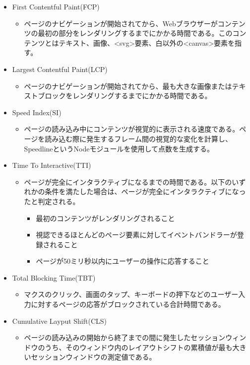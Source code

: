 \begin{itemize}
    \item First Contentful Paint(FCP)
    \begin{itemize}
        \item ページのナビゲーションが開始されてから、Webブラウザーがコンテンツの最初の部分をレンダリングするまでにかかる時間である。このコンテンツとはテキスト、画像、<svg>要素、白以外の<canvas>要素を指す。
    \end{itemize}
    \item Largest Contentful Paint(LCP)
    \begin{itemize}
        \item ページのナビゲーションが開始されてから、最も大きな画像またはテキストブロックをレンダリングするまでにかかる時間である。
    \end{itemize}
    \item Speed Index(SI)
    \begin{itemize}
        \item ページの読み込み中にコンテンツが視覚的に表示される速度である。ページを読み込む際に発生するフレーム間の視覚的な変化を計算し、SpeedlineというNodeモジュールを使用して点数を生成する。
    \end{itemize}
    \item Time To Interactive(TTI)
    \begin{itemize}
        \item ページが完全にインタラクティブになるまでの時間である。以下のいずれかの条件を満たした場合は、ページが完全にインタラクティブになったと判定される。
        \begin{itemize}
            \item 最初のコンテンツがレンダリングされること
            \item 視認できるほとんどのページ要素に対してイベントバンドラーが登録されること
            \item ページが50ミリ秒以内にユーザーの操作に応答すること
        \end{itemize}
    \end{itemize}
    \item Total Blocking Time(TBT)
    \begin{itemize}
        \item マクスのクリック、画面のタップ、キーボードの押下などのユーザー入力に対するページの応答がブロックされている合計時間である。
    \end{itemize}
    \item Cumulative Layput Shift(CLS)
    \begin{itemize}
        \item ページの読み込みの開始から終了までの間に発生したセッションウィンドウのうち、そのウィンドウ内のレイアウトシフトの累積値が最も大きいセッションウィンドウの測定値である。
    \end{itemize}
\end{itemize}

